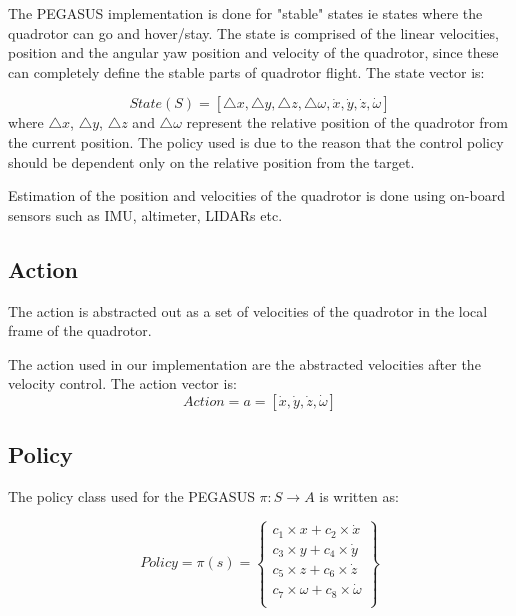 \documentclass[hidelinks,BTech]{iitmdiss}
\begin{document}
The PEGASUS implementation is done for "stable" states ie states where the quadrotor can go and hover/stay. The state is comprised of the linear velocities, position and the angular yaw position and velocity of the quadrotor, since these can completely define the stable parts of quadrotor flight. 
The state vector is:

\begin{equation}
  State(S) = [\triangle{x}, \triangle{y}, \triangle{z}, \triangle{\omega}, \dot{x}, \dot{y}, \dot{z}, \dot{\omega}]
\end{equation}
where $\triangle{x}$, $\triangle{y}$, $\triangle{z}$ and $\triangle{\omega}$ represent the relative position of the quadrotor from the current position. The policy used is due to the reason that the control policy should be dependent only on the relative position from the target.  

Estimation of the position and velocities of the quadrotor is done using on-board sensors such as IMU, altimeter, LIDARs etc. 

\subsection*{Action} The action is abstracted out as a set of velocities of the quadrotor in the local frame of the quadrotor.

The action used in our implementation are the abstracted velocities after the velocity control. The action vector is:
\begin{equation}
  Action = a = [\dot{x}, \dot{y}, \dot{z}, \dot{\omega}]
\end{equation}

\subsection*{Policy}
The policy class used for the PEGASUS $\pi: S \rightarrow A$ is written as:

\begin{equation}
  Policy = \pi(s) = \left\{
    \begin{array}{c}
      c_1 \times x + c_2 \times \dot{x} \\
      c_3 \times y + c_4 \times \dot{y} \\
      c_5 \times z + c_6 \times \dot{z} \\
      c_7 \times \omega + c_8 \times \dot{\omega} \\
    \end{array}
  \right\}
\end{equation}
\end{document}
